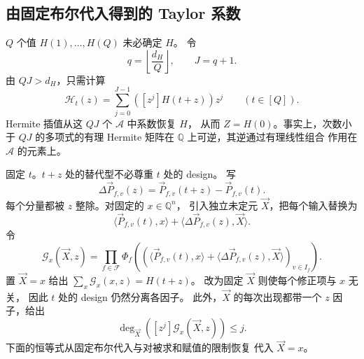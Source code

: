 \subsection{由固定布尔代入得到的 Taylor 系数}
\label{subsec:fixed-boolean-substitutions}
$Q$ 个值 $H(1),\ldots,H(Q)$ 未必确定 $H$。
令
\begin{equation}\label{eq:hasse-order}
 q=\left\lfloor\frac{d_H}{Q}\right\rfloor,\qquad J=q+1.
\end{equation}
由 $QJ>d_H$，只需计算
\begin{equation}\label{eq:taylor-truncation}
 \mathcal H_t(z)=\sum_{j=0}^{J-1}([z^j]H(t+z))z^j
 \qquad(t\in[Q]).
\end{equation}
Hermite 插值从这 $QJ$ 个 $\mathcal A$ 中系数恢复 $H$，
从而 $Z=H(0)$。事实上，次数小于 $QJ$ 的多项式的有理
Hermite 矩阵在 $\mathbb Q$ 上可逆，其逆通过有理线性组合
作用在 $\mathcal A$ 的元素上。

固定 $t$。$t+z$ 处的替代型不必尊重 $t$ 处的 design。
写
\[
 \Delta\vec P_{f,v}(z)=\vec P_{f,v}(t+z)-\vec P_{f,v}(t).
\]
每个分量都被 $z$ 整除。对固定的 $x\in\mathbb Q^n$，
引入独立未定元 $\vec X$，把每个输入替换为
\begin{equation}\label{eq:jet-substitution}
 \langle\vec P_{f,v}(t),x\rangle
       +\langle\Delta\vec P_{f,v}(z),\vec X\rangle.
\end{equation}
令
\begin{equation}\label{eq:auxiliary-polynomial}
 \mathcal G_x(\vec X,z)=\prod_{f\in\mathcal F}
 \Phi_f\!\left(
  (\langle\vec P_{f,v}(t),x\rangle+
   \langle\Delta\vec P_{f,v}(z),\vec X\rangle)_{v\in I_f}\right).
\end{equation}
置 $\vec X=x$ 给出
$\sum_x\mathcal G_x(x,z)=H(t+z)$。
改为固定 $\vec X$ 则使每个修正项与 $x$ 无关，
因此 $t$ 处的 design 仍然分离各因子。
此外，$\vec X$ 的每次出现都带一个 $z$ 因子，给出
\begin{equation}\label{eq:degree-cost}
 \deg_{\vec X}([z^j]\mathcal G_x(\vec X,z))\le j.
\end{equation}
下面的恒等式从固定布尔代入与对被求和赋值的限制恢复
代入 $\vec X=x$。


